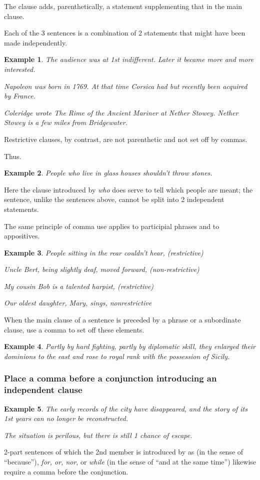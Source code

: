\documentclass{article}
\newtheorem{example}{Example}
\begin{document}
The clause adds, parenthetically, a statement supplementing that in the main clause.

Each of the 3 sentences is a combination of 2 statements that might have been made independently.
\begin{example}
	The audience was at 1st indifferent. Later it became more and more interested.
	
	Napoleon was born in 1769. At that time Corsica had but recently been acquired by France.
	
	Coleridge wrote The Rime of the Ancient Mariner at Nether Stowey. Nether Stowey is a few miles from Bridgewater.
\end{example}
Restrictive clauses, by contrast, are not parenthetic and not set off by commas.

Thus.
\begin{example}
	People who live in glass houses shouldn't throw stones.
\end{example}
Here the clause introduced by {\it who} does serve to tell which people are meant; the sentence, unlike the sentences above, cannot be split into 2 independent statements.

The same principle of comma use applies to participial phrases and to appositives.
\begin{example}
	People sitting in the rear couldn't hear, \emph{(restrictive)}
	
	Uncle Bert, being slightly deaf, moved forward, \emph{(non-restrictive)}
	
	My cousin Bob is a talented harpist, \emph{(restrictive)}
	
	Our oldest daughter, Mary, sings, \emph{nonrestrictive}
\end{example}
When the main clause of a sentence is preceded by a phrase or a subordinate clause, use a comma to set off these elements.
\begin{example}
	Partly by hard fighting, partly by diplomatic skill, they enlarged their dominions to the east and rose to royal rank with the possession of Sicily.
\end{example}


\subsubsection{Place a comma before a conjunction introducing an independent clause}
\begin{example}
	The early records of the city have disappeared, and the story of its 1st years can no longer be reconstructed.
	
	The situation is perilous, but there is still 1 chance of escape.
\end{example}
2-part sentences of which the 2nd member is introduced by as (in the sense of ``because''), {\it for, or, nor}, or {\it while} (in the sense of ``and at the same time'') likewise require a comma before the conjunction.
\end{document}
